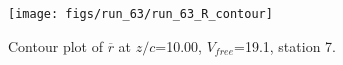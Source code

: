 \begin{figure}[H]
\centering
\texttt{[image: figs/run\_63/run\_63\_R\_contour]}
\caption{Contour plot of $\overline{r}$ at $z/c$=10.00, $V_{free}$=19.1, station 7.}
\label{fig:run_63_R_contour}
\end{figure}


